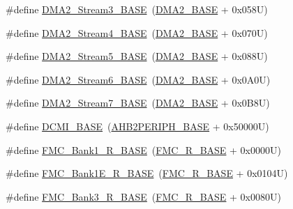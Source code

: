 \begin{DoxyCompactItemize}
\item 
\#define \hyperlink{group___peripheral__memory__map_gaf3a9480e08c6ae94f4482e0cdaebdd17}{D\+M\+A2\+\_\+\+Stream3\+\_\+\+B\+A\+SE}~(\hyperlink{group___peripheral__memory__map_gab72a9ae145053ee13d1d491fb5c1df64}{D\+M\+A2\+\_\+\+B\+A\+SE} + 0x058\+U)
\item 
\#define \hyperlink{group___peripheral__memory__map_gad1e67740e6301233473f64638145dd1f}{D\+M\+A2\+\_\+\+Stream4\+\_\+\+B\+A\+SE}~(\hyperlink{group___peripheral__memory__map_gab72a9ae145053ee13d1d491fb5c1df64}{D\+M\+A2\+\_\+\+B\+A\+SE} + 0x070\+U)
\item 
\#define \hyperlink{group___peripheral__memory__map_gaed1460fdc407b6decfbffccb0260d0af}{D\+M\+A2\+\_\+\+Stream5\+\_\+\+B\+A\+SE}~(\hyperlink{group___peripheral__memory__map_gab72a9ae145053ee13d1d491fb5c1df64}{D\+M\+A2\+\_\+\+B\+A\+SE} + 0x088\+U)
\item 
\#define \hyperlink{group___peripheral__memory__map_ga5e81174c96fd204fa7c82c815e85c8e6}{D\+M\+A2\+\_\+\+Stream6\+\_\+\+B\+A\+SE}~(\hyperlink{group___peripheral__memory__map_gab72a9ae145053ee13d1d491fb5c1df64}{D\+M\+A2\+\_\+\+B\+A\+SE} + 0x0\+A0\+U)
\item 
\#define \hyperlink{group___peripheral__memory__map_gaa9faa708ad2440d24eb1064cba9bb06d}{D\+M\+A2\+\_\+\+Stream7\+\_\+\+B\+A\+SE}~(\hyperlink{group___peripheral__memory__map_gab72a9ae145053ee13d1d491fb5c1df64}{D\+M\+A2\+\_\+\+B\+A\+SE} + 0x0\+B8\+U)
\item 
\#define \hyperlink{group___peripheral__memory__map_ga55b794507e021135486de57129a2505c}{D\+C\+M\+I\+\_\+\+B\+A\+SE}~(\hyperlink{group___peripheral__memory__map_gaeedaa71d22a1948492365e2cd26cfd46}{A\+H\+B2\+P\+E\+R\+I\+P\+H\+\_\+\+B\+A\+SE} + 0x50000\+U)
\item 
\#define \hyperlink{group___peripheral__memory__map_ga1d581e6f64ed2e5d97c11c58285a21b6}{F\+M\+C\+\_\+\+Bank1\+\_\+\+R\+\_\+\+B\+A\+SE}~(\hyperlink{group___peripheral__memory__map_ga7a599164cd92798542bc6288793d1ed5}{F\+M\+C\+\_\+\+R\+\_\+\+B\+A\+SE} + 0x0000\+U)
\item 
\#define \hyperlink{group___peripheral__memory__map_gad82d3a6bac014fa645fb67a63fae4bc0}{F\+M\+C\+\_\+\+Bank1\+E\+\_\+\+R\+\_\+\+B\+A\+SE}~(\hyperlink{group___peripheral__memory__map_ga7a599164cd92798542bc6288793d1ed5}{F\+M\+C\+\_\+\+R\+\_\+\+B\+A\+SE} + 0x0104\+U)
\item 
\#define \hyperlink{group___peripheral__memory__map_gaf570671195a13f4bb2a1b8f2bd5305c9}{F\+M\+C\+\_\+\+Bank3\+\_\+\+R\+\_\+\+B\+A\+SE}~(\hyperlink{group___peripheral__memory__map_ga7a599164cd92798542bc6288793d1ed5}{F\+M\+C\+\_\+\+R\+\_\+\+B\+A\+SE} + 0x0080\+U)

\end{DoxyCompactItemize}
